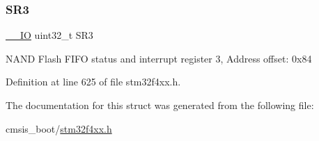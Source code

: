 \subsubsection{\texorpdfstring{S\+R3}{SR3}}
{\footnotesize\ttfamily \hyperlink{group___c_m_s_i_s__core__definitions_gaec43007d9998a0a0e01faede4133d6be}{\+\_\+\+\_\+\+IO} uint32\+\_\+t S\+R3}

N\+A\+ND Flash F\+I\+FO status and interrupt register 3, Address offset\+: 0x84 

Definition at line 625 of file stm32f4xx.\+h.



The documentation for this struct was generated from the following file\+:\begin{DoxyCompactItemize}
\item 
cmsis\+\_\+boot/\hyperlink{stm32f4xx_8h}{stm32f4xx.\+h}\end{DoxyCompactItemize}
